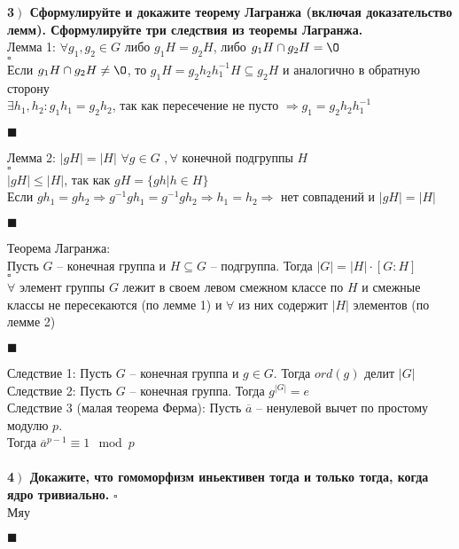 \documentclass[a4paper,12pt]{article}
\begin{document}
    \textbf{3$\left.\right)$ Сформулируйте и докажите теорему Лагранжа (включая доказательство лемм). Сформулируйте три следствия из теоремы Лагранжа.}\\Лемма 1: $\forall g_1, g_2\in G$ либо $g_1H=g_2H$, либо $g_1H\cap g_2H=\O$\\
    $\square$\\
    Если $g_1H\cap g_2H\ne\O$, то $g_1H=g_2h_2h^{-1}_1H\subseteq g_2H$ и аналогично в обратную сторону\\
    $\exists h_1, h_2:g_1h_1=g_2h_2$, так как пересечение не пусто $\Rightarrow g_1=g_2h_2h^{-1}_1$
    \begin{flushright}
        $\blacksquare$
    \end{flushright}
    Лемма 2: $|gH|=|H|$ $\forall g\in G$ $, \forall$ конечной подгруппы $H$\\
    $\square$\\
    $|gH|\leq|H|$, так как $gH=\{gh|h\in H \}$\\
    Если $gh_1=gh_2\Rightarrow g^{-1}gh_1=g^{-1}gh_2\Rightarrow h_1=h_2\Rightarrow$ нет совпадений и $|gH|=|H|$
    \begin{flushright}
        $\blacksquare$
    \end{flushright}
    Теорема Лагранжа:\\
    Пусть $G$ -- конечная группа и $H\subseteq G$ -- подгруппа. Тогда $|G|=|H|\cdot[G:H]$\\
    $\square$\\
    $\forall$ элемент группы $G$ лежит в своем левом смежном классе по $H$ и смежные классы не пересекаются (по лемме 1) и $\forall$ из них содержит $|H|$ элементов (по лемме 2)
    \begin{flushright}
        $\blacksquare$
    \end{flushright}
    Следствие 1: Пусть $G$ -- конечная группа и $g\in G$. Тогда $ord(g)$ делит $|G|$\\Следствие 2: Пусть $G$ -- конечная группа. Тогда $g^{|G|}=e$\\Следствие 3 (малая теорема Ферма):
    Пусть $\overline a $ -- ненулевой вычет по простому модулю $p$.\\Тогда $\overline{a}^{p-1}\equiv1\mod p$\\ \\

    \textbf{4$\left.\right)$ Докажите, что гомоморфизм иньективен тогда и только тогда, когда ядро тривиально.}
    $\square$\\
    Мяу
    \begin{flushright}
        $\blacksquare$
    \end{flushright}
\end{document}
